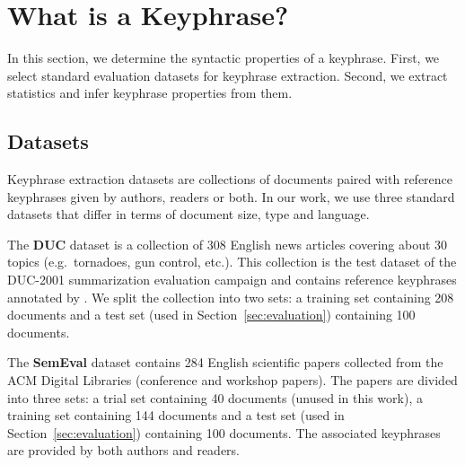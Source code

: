 

\section{What is a Keyphrase?}
\label{sec:definition_of_candidate_keyphrases}
  In this section, we determine the syntactic properties of a keyphrase. First,
  we select standard evaluation datasets for keyphrase extraction. Second, we
  extract statistics and infer keyphrase properties from them.

  \subsection{Datasets}
  \label{subsec:keyphrase_extraction_datasets}
    Keyphrase extraction datasets are collections of documents paired with
    reference keyphrases given by authors, readers or both. In our work, we use
    three standard datasets that differ in terms of document size,  type and
    language.

    The \textbf{DUC} dataset \cite{over2001duc} is a collection of 308 English
    news articles covering about 30 topics (e.g.~tornadoes, gun control, etc.).
    This collection is the test dataset of the DUC-2001 summarization evaluation
    campaign and contains reference keyphrases annotated by
    . We split the collection into two sets: a
    training set containing 208 documents and a test set (used in
    Section~\ref{sec:evaluation}) containing 100 documents.

    The \textbf{SemEval} dataset \cite{kim2010semeval} contains 284 English
    scientific papers collected from the ACM Digital Libraries (conference and
    workshop papers). The papers are divided into three sets: a trial set
    containing 40 documents (unused in this work), a training set containing 144
    documents and a test set (used in Section~\ref{sec:evaluation}) containing
    100 documents. The associated keyphrases are provided by both authors and
    readers.

